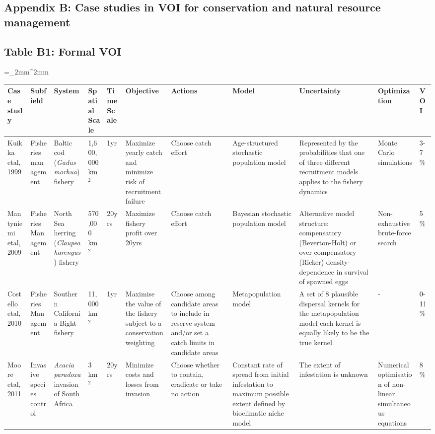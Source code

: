 \newpage
\begin{landscape}
\section*{Appendix B: Case studies in VOI for conservation and natural resource management}

\subsection*{Table B1: Formal VOI}
\bgroup
\linespread{1}\scriptsize
\extrarowsep=_2mm^2mm
\begin{longtabu} to 230mm {|X[1,l] X[1,l] X[1,l] X[1,l] X[.8,l] X[1,l] X[1,l] X[1,l] X[1,l] X[1,l] X[1,l]|} \hline 
Case study & Subfield & System & Spatial Scale & Time Scale & Objective & Actions & Model & Uncertainty & Optimization & VOI \\ \hline
Kuikka etal, 1999 & Fisheries management & Baltic cod (\textit{Gadus morhua}) fishery & 1,600,000 km$^2$ & 1yr & Maximize yearly catch and minimize risk of recruitment failure & Choose catch effort & Age-structured stochastic population model & Represented by the probabilities that one of three different recruitment models applies to the fishery dynamics & Monte Carlo simulations & 3-7\% \\
Mantyniemi etal, 2009 & Fisheries Management & North Sea herring (\textit{Claupea harengus}) fishery & 570,000 km$^2$ & 20yrs & Maximize fishery profit over 20yrs & Choose catch effort & Bayesian stochastic population model & Alternative model structure: compensatory (Beverton-Holt) or over-compensatory (Ricker) density-dependence in survival of spawned eggs & Non-exhaustive brute-force search & 5\% \\
Costello etal, 2010 & Fisheries Management & Southern California Bight fishery & 11,000 km$^2$ & 1yr & Maximise the value of the fishery subject to a conservation weighting & Choose among candidate areas to include in reserve system and/or set a catch limits in candidate areas  & Metapopulation model & A set of 8 plausible dispersal kernels for the metapopulation model each kernel is equally likely to be the true kernel & - & 0-11\% \\
Moore etal, 2011 & Invasive species control & \textit{Acacia paradoxa} invasion of South Africa & 3 km$^2$ & 20yrs & Minimize costs and losses from invasion & Choose whether to contain, eradicate or take no action & Constant rate of spread from initial infestation to maximum possible extent defined by bioclimatic niche model & The extent of infestation is unknown & Numerical optimisation of non-linear simultaneous equations & 8\% \\

\end{longtabu}
\end{landscape}
